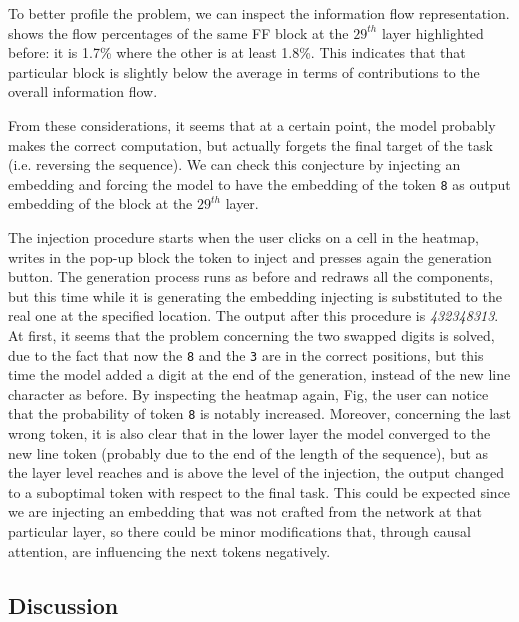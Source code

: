 {To better profile the problem, we can inspect the information flow representation.
shows the flow percentages of the same FF block at the $29^{th}$ layer highlighted before: it is 1.7\% where the other is at least 1.8\%.
This indicates that that particular block is slightly below the average in terms of contributions to the overall information flow.

From these considerations, it seems that at a certain point, the model probably makes the correct computation, but actually forgets the final target of the task (i.e. reversing the sequence).
We can check this conjecture by injecting an embedding and forcing the model to have the embedding of the token \texttt{8} as output embedding of the block at the $29^{th}$ layer.

The injection procedure starts when the user clicks on a cell in the heatmap, writes in the pop-up block the token to inject and presses again the generation button.
The generation process runs as before and redraws all the components, but this time while it is generating the embedding injecting is substituted to the real one at the specified location.
The output after this procedure is \emph{432348313}.
At first, it seems that the problem concerning the two swapped digits is solved, due to the fact that now the \texttt{8} and the \texttt{3} are in the correct positions, but this time the model added a digit at the end of the generation, instead of the new line character as before.
By inspecting the heatmap again, Fig, the user can notice that the probability of token \texttt{8} is notably increased.
Moreover, concerning the last wrong token, it is also clear that in the lower layer the model converged to the new line token (probably due to the end of the length of the sequence), but as the layer level reaches and is above the level of the injection, the output changed to a suboptimal token with respect to the final task.
This could be expected since we are injecting an embedding that was not crafted from the network at that particular layer, so there could be minor modifications that, through causal attention, are influencing the next tokens negatively.
}

\subsection{Discussion}



